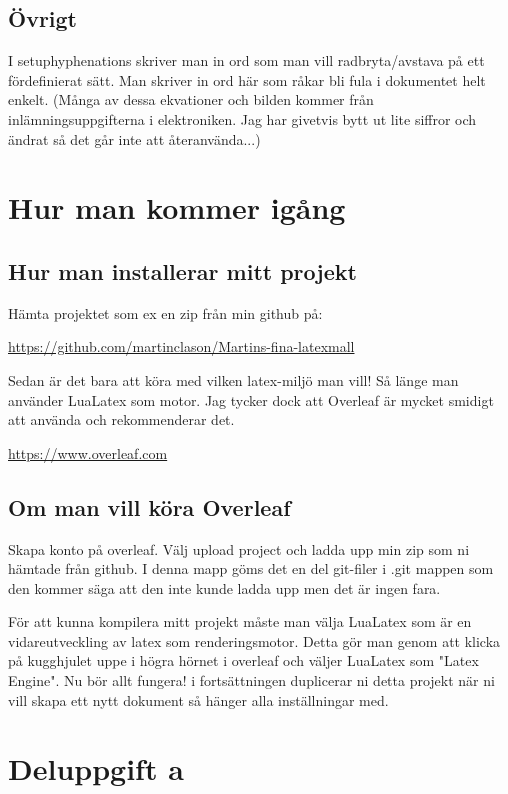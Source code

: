\subsection*{Övrigt}
I setup\/hyphenations skriver man in ord som man vill radbryta/avstava på ett fördefinierat sätt. Man skriver in ord här som råkar bli fula i dokumentet helt enkelt. (Många av dessa ekvationer och bilden kommer från inlämningsuppgifterna i elektroniken. Jag har givetvis bytt ut lite siffror och ändrat så det går inte att återanvända...)

\newpage
\section{Hur man kommer igång}
\subsection{Hur man installerar mitt projekt}
Hämta projektet som ex en zip från min github på:

\url{https://github.com/martinclason/Martins-fina-latexmall}

Sedan är det bara att köra med vilken latex-miljö man vill! Så länge man använder LuaLatex som motor. Jag tycker dock att Overleaf är mycket smidigt att använda och rekommenderar det.

\url{https://www.overleaf.com}

\subsection{Om man vill köra Overleaf}
Skapa konto på overleaf. Välj upload project och ladda upp min zip som ni hämtade från github. I denna mapp göms det en del git-filer i .git mappen som den kommer säga att den inte kunde ladda upp men det är ingen fara.

För att kunna kompilera mitt projekt måste man välja LuaLatex som är en vidareutveckling av latex som renderingsmotor. Detta gör man genom att klicka på kugghjulet uppe i högra hörnet i overleaf och väljer LuaLatex som "Latex Engine". Nu bör allt fungera! i fortsättningen duplicerar ni detta projekt när ni vill skapa ett nytt dokument så hänger alla inställningar med.


% 

\clearpage
\section{Deluppgift a}

